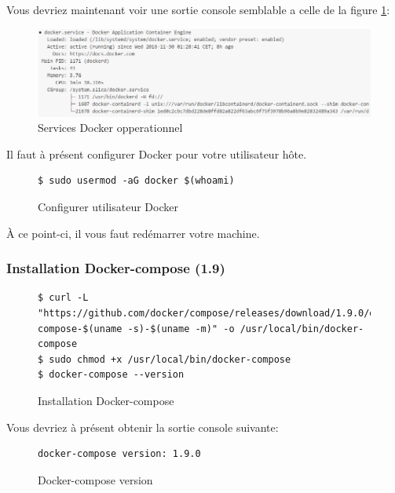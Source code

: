 Vous devriez maintenant voir une sortie console semblable a celle de la figure \ref{fig:dockerservices}:

\begin{figure}[H] 
\centering 
\includegraphics[width=1\columnwidth]{img/docker-services} 
\caption[docker services]{Services Docker opperationnel}
\label{fig:dockerservices} 
\end{figure}

Il faut à présent configurer Docker pour votre utilisateur hôte.

\begin{figure}[H] 
\centering
\begin{lstlisting}[frame=single]
$ sudo usermod -aG docker $(whoami)
\end{lstlisting}
\caption[Code - Configurer utlisateur Docker]{Configurer utilisateur Docker}
\label{fig:configUserDocker} 
\end{figure}

À ce point-ci, il vous faut redémarrer votre machine.

\subsubsection{Installation Docker-compose (1.9)}

\begin{figure}[H] 
\centering 
\begin{lstlisting}[frame=single]
$ curl -L "https://github.com/docker/compose/releases/download/1.9.0/docker-compose-$(uname -s)-$(uname -m)" -o /usr/local/bin/docker-compose
$ sudo chmod +x /usr/local/bin/docker-compose
$ docker-compose --version
\end{lstlisting}
\caption[Code - Installation Docker-compose]{Installation Docker-compose}
\label{fig:installCompose} 
\end{figure}

Vous devriez à présent obtenir la sortie console suivante:

\begin{figure}[H] 
\centering 
\begin{lstlisting}[frame=single]
docker-compose version: 1.9.0
\end{lstlisting}
\caption[Code - Docker-compose version]{Docker-compose version}
\label{fig:composeVersion} 
\end{figure}

